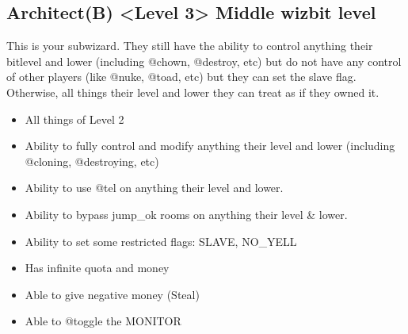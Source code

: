 \documentclass[letterpaper,10pt,english]{sphinxmanual}
\begin{document}
\subsection{Architect(B) \textless{}Level 3\textgreater{} \sphinxhyphen{} Middle wizbit level}
\label{\detokenize{toggles:architect-b-level-3-middle-wizbit-level}}
\sphinxAtStartPar
This is your sub\sphinxhyphen{}wizard.  They still have the ability to control
anything their bitlevel and lower (including @chown, @destroy, etc)
but do not have any control of other players (like @nuke, @toad, etc)
but they can set the slave flag.  Otherwise, all things their level
and lower they can treat as if they owned it.
\begin{itemize}
\item {} 
\sphinxAtStartPar
All things of Level 2

\item {} 
\sphinxAtStartPar
Ability to fully control and modify anything their level and lower (including @cloning, @destroying, etc)

\item {} 
\sphinxAtStartPar
Ability to use @tel on anything their level and lower.

\item {} 
\sphinxAtStartPar
Ability to bypass jump\_ok rooms on anything their level \& lower.

\item {} 
\sphinxAtStartPar
Ability to set some restricted flags: SLAVE, NO\_YELL

\item {} 
\sphinxAtStartPar
Has infinite quota and money

\item {} 
\sphinxAtStartPar
Able to give negative money (Steal)

\item {} 
\sphinxAtStartPar
Able to @toggle the MONITOR

\end{itemize}
\end{document}
